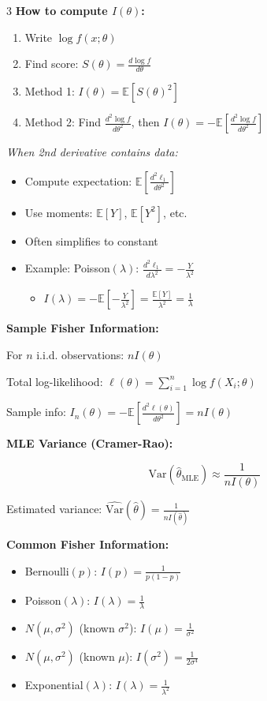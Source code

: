 \documentclass[10pt,letterpaper]{article}
\newcommand{\Var}{\text{Var}}
\newcommand{\E}{\mathbb{E}}
\begin{document}
\begin{multicols}{3}
\textbf{How to compute $I(\theta)$:}
\begin{enumerate}
\item Write $\log f(x; \theta)$
\item Find score: $S(\theta) = \frac{d\log f}{d\theta}$
\item Method 1: $I(\theta) = \E[S(\theta)^2]$
\item Method 2: Find $\frac{d^2\log f}{d\theta^2}$, then $I(\theta) = -\E[\frac{d^2\log f}{d\theta^2}]$
\end{enumerate}

\textit{When 2nd derivative contains data:}
\begin{itemize}
\item Compute expectation: $\E[\frac{d^2\ell_1}{d\theta^2}]$
\item Use moments: $\E[Y]$, $\E[Y^2]$, etc.
\item Often simplifies to constant
\item Example: Poisson$(\lambda)$: $\frac{d^2\ell_1}{d\lambda^2} = -\frac{Y}{\lambda^2}$
  \begin{itemize}
  \item $I(\lambda) = -\E[-\frac{Y}{\lambda^2}] = \frac{\E[Y]}{\lambda^2} = \frac{1}{\lambda}$
  \end{itemize}
\end{itemize}

\textbf{Sample Fisher Information:}

For $n$ i.i.d. observations: $nI(\theta)$

Total log-likelihood: $\ell(\theta) = \sum_{i=1}^n \log f(X_i; \theta)$

Sample info: $I_n(\theta) = -\E\left[\frac{d^2\ell(\theta)}{d\theta^2}\right] = nI(\theta)$

\textbf{MLE Variance (Cramer-Rao):}

$$\Var(\hat{\theta}_{\text{MLE}}) \approx \frac{1}{nI(\theta)}$$

Estimated variance: $\widehat{\Var}(\hat{\theta}) = \frac{1}{nI(\hat{\theta})}$

\textbf{Common Fisher Information:}
\begin{itemize}
\item Bernoulli$(p)$: $I(p) = \frac{1}{p(1-p)}$
\item Poisson$(\lambda)$: $I(\lambda) = \frac{1}{\lambda}$
\item $N(\mu, \sigma^2)$ (known $\sigma^2$): $I(\mu) = \frac{1}{\sigma^2}$
\item $N(\mu, \sigma^2)$ (known $\mu$): $I(\sigma^2) = \frac{1}{2\sigma^4}$
\item Exponential$(\lambda)$: $I(\lambda) = \frac{1}{\lambda^2}$
\end{itemize}


\end{multicols}
\end{document}
